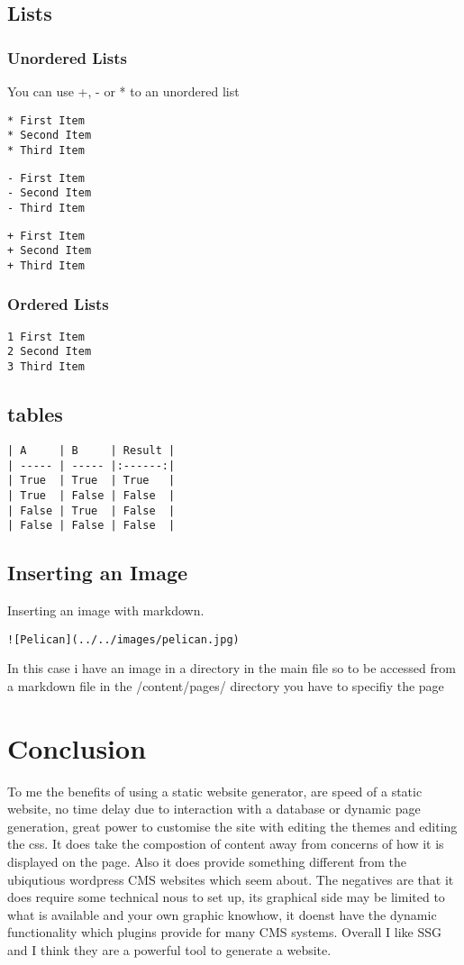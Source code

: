 \documentclass[12pt]{article}			%
\begin{document}
\subsection{Lists}
\subsubsection{Unordered Lists}
You can use +, - or * to an unordered list
\begin{verbatim}
* First Item
* Second Item
* Third Item
\end{verbatim}
\begin{verbatim}
- First Item
- Second Item
- Third Item
\end{verbatim}
\begin{verbatim}
+ First Item
+ Second Item
+ Third Item
\end{verbatim}
\subsubsection{Ordered Lists}
\begin{verbatim}
1 First Item
2 Second Item
3 Third Item
\end{verbatim}

\subsection{tables}

\begin{verbatim}
| A     | B     | Result |
| ----- | ----- |:------:|
| True  | True  | True   |
| True  | False | False  |
| False | True  | False  |
| False | False | False  |

\end{verbatim}
\subsection{Inserting an Image}
Inserting an image with markdown.
\begin{verbatim}
![Pelican](../../images/pelican.jpg)
\end{verbatim}
In this case i have an image in a directory in the main file so to be accessed from a markdown file in the /content/pages/ directory you have to specifiy the page


\newpage
\section{Conclusion}
To me the benefits of using a static website generator, are speed of a static website,
no time delay due to interaction with a database or dynamic page generation, great power to customise the site with editing the themes and editing the css. It does take the compostion of content away from concerns of how it is displayed on the page.
Also it does provide something different from the ubiqutious wordpress CMS websites which seem about.
The negatives are that it does require some technical nous to set up, its graphical side may be limited to what is available and your own graphic knowhow, it doenst have the dynamic functionality which plugins provide for many CMS systems.
Overall I like SSG and I think they are a powerful tool to generate a website.
\end{document}
